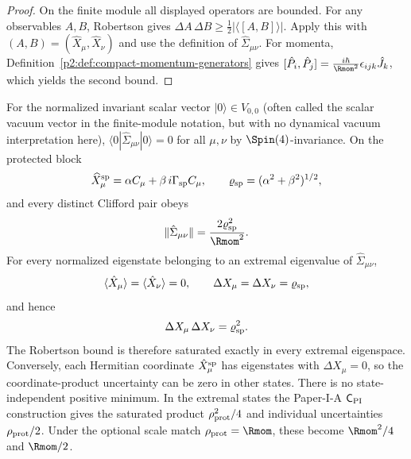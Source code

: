 \documentclass[11pt,a4paper]{article}
\begin{document}
\begin{proof}
On the finite module all displayed operators are bounded.  For any observables $A,B$, Robertson gives $\Delta A\,\Delta B\ge \frac12|\langle[A,B]\rangle|$. Apply this with $(A,B)=(\hat X_\mu,\hat X_\nu)$ and use the definition of $\hat\Sigma_{\mu\nu}$. For momenta, Definition~\ref{p2:def:compact-momentum-generators} gives $[\hat{P}_i,\hat{P}_j]=\frac{i\hbar}{\Rmom^2}\epsilon_{ijk}\hat J_k$, which yields the second bound.
\end{proof}


\begin{corollary}
\label{p2:cor:fermionic-precision}
For the normalized invariant scalar vector
\( |0\rangle\in V_{0,0}\) (often called the scalar vacuum vector in the
finite-module notation, but with no dynamical vacuum interpretation here),
\(\langle0|\hat\Sigma_{\mu\nu}|0\rangle=0\) for all \(\mu,\nu\) by
\(\Spin(4)\)-invariance.  On the protected block
\[
\widehat X_\mu^{\rm sp}
=\alpha C_\mu+\beta\,i\Gamma_{\rm sp}C_\mu,
\qquad
\varrho_{\rm sp}=(\alpha^2+\beta^2)^{1/2},
\]
and every distinct Clifford pair obeys
\[
\|\hat\Sigma_{\mu\nu}\|=\frac{2\varrho_{\rm sp}^2}{\Rmom^2}.
\]
For every normalized eigenstate belonging to an extremal eigenvalue of
\(\hat\Sigma_{\mu\nu}\),
\[
\langle\hat X_\mu\rangle=\langle\hat X_\nu\rangle=0,
\qquad
\Delta X_\mu=\Delta X_\nu=\varrho_{\rm sp},
\]
and hence
\[
\Delta X_\mu\,\Delta X_\nu=\varrho_{\rm sp}^2.
\]
The Robertson bound is therefore saturated exactly in every extremal
eigenspace.  Conversely, each Hermitian coordinate
\(\hat X_\mu^{\rm sp}\) has eigenstates with \(\Delta X_\mu=0\), so the
coordinate-product uncertainty can be zero in other states.  There is no
state-independent positive minimum.  In the extremal states the Paper-I-A
\(\mathsf C_{\rm PI}\) construction gives the saturated product
\(\rho_{\rm prot}^2/4\) and individual uncertainties
\(\rho_{\rm prot}/2\).  Under the optional scale match
\(\rho_{\rm prot}=\Rmom\), these become \(\Rmom^2/4\) and \(\Rmom/2\).
\end{corollary}
\end{document}
